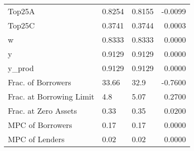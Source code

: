\begin{table}
\begin{tabular}{lllr}
                  Top25A &  0.8254 &   0.8155 & -0.0099 \\
                  Top25C &  0.3741 &   0.3744 &  0.0003 \\
                       w &  0.8333 &   0.8333 &  0.0000 \\
                       y &  0.9129 &   0.9129 &  0.0000 \\
                  y\_prod &  0.9129 &   0.9129 &  0.0000 \\
      Frac. of Borrowers &   33.66 &     32.9 & -0.7600 \\
Frac. at Borrowing Limit &     4.8 &     5.07 &  0.2700 \\
    Frac. at Zero Assets &    0.33 &     0.35 &  0.0200 \\
        MPC of Borrowers &    0.17 &     0.17 &  0.0000 \\
          MPC of Lenders &    0.02 &     0.02 &  0.0000 \\
\bottomrule
\end{tabular}
\end{table}
